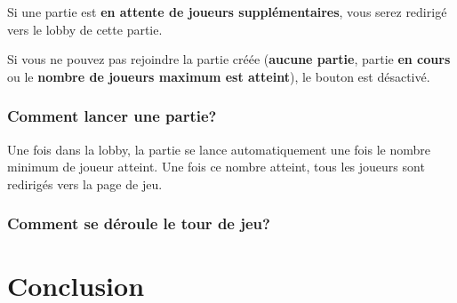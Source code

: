 \documentclass[11pt]{scrreprt}
\begin{document}
    Si une partie est \textbf{en attente de joueurs supplémentaires}, vous serez redirigé vers le lobby de cette partie.

    Si vous ne pouvez pas rejoindre la partie créée (\textbf{aucune partie}, partie \textbf{en cours} ou le \textbf{nombre de joueurs maximum est atteint}), le bouton est désactivé.

    \subsection{Comment lancer une partie?}
    Une fois dans la lobby, la partie se lance automatiquement une fois le nombre minimum de joueur atteint. Une fois ce nombre atteint, tous les joueurs sont redirigés vers la page de jeu.

    \subsection{Comment se déroule le tour de jeu?}
    
    \chapter{Conclusion}
\end{document}
